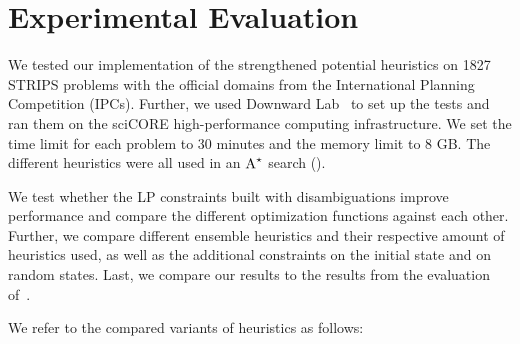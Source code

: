 \chapter{Experimental Evaluation}\label{ch:evaluation}

We tested our implementation of the strengthened potential heuristics on 1827 STRIPS problems with the official domains from the International Planning Competition (IPCs).
Further, we used Downward Lab~\cite{seipp-et-al-zenodo2017} to set up the tests and ran them on the sciCORE high-performance computing infrastructure.
We set the time limit for each problem to 30 minutes and the memory limit to 8 GB.
The different heuristics were all used in an $\textup{A}^{\star}$ search (\citeauthor{hart1968formal}).

We test whether the LP constraints built with disambiguations improve performance and compare the different optimization functions against each other.
Further, we compare different ensemble heuristics and their respective amount of heuristics used, as well as the additional constraints on the initial state and on random states.
Last, we compare our results to the results from the evaluation of~\citeauthor{fivser2020strengthening}.

We refer to the compared variants of heuristics as follows:

